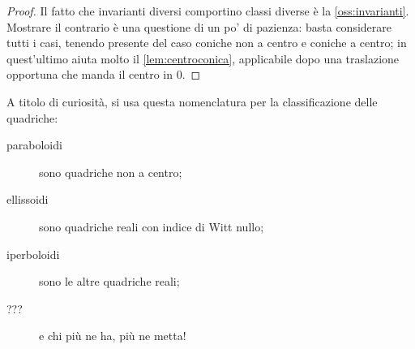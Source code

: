  

\begin{proof}
	Il fatto che invarianti diversi comportino classi diverse è la \cref{oss:invarianti}.
	Mostrare il contrario è una questione di un po' di pazienza: basta considerare tutti i casi, tenendo presente del caso coniche non a centro
	e coniche a centro; in quest'ultimo aiuta molto il \cref{lem:centroconica}, applicabile dopo una traslazione opportuna che manda il centro
	in $0$.
\end{proof}

\begin{remark}
	A titolo di curiosità, si usa questa nomenclatura per la classificazione delle quadriche:
	\begin{description}
	 \item[paraboloidi] sono quadriche non a centro;
	 \item[ellissoidi] sono quadriche reali con indice di Witt nullo;
	 \item[iperboloidi] sono le altre quadriche reali;
	 \item[???] e chi più ne ha, più ne metta!
	\end{description}

\end{remark}


